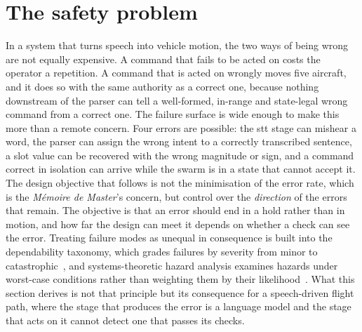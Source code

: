 \section{The safety problem}
\label{sec:safety-problem}
In a system that turns speech into vehicle motion, the two ways of being wrong are not equally
expensive. A command that fails to be acted on costs the operator a repetition. A command that is
acted on wrongly moves five aircraft, and it does so with the same authority as a correct one,
because nothing downstream of the parser can tell a well-formed, in-range and state-legal wrong
command from a correct one. The failure surface is wide enough to make this more than a remote
concern. Four errors are possible: the \gls{stt} stage can mishear a word, the parser can assign
the wrong intent to a correctly transcribed sentence, a slot value can be recovered with the wrong
magnitude or sign, and a command correct in isolation can arrive while the swarm is in a state
that cannot accept it. The design objective that follows is not the minimisation of the error
rate, which is the \emph{M\'emoire de Master}'s concern, but control over the \emph{direction} of
the errors that remain. The objective is that an error should end in a hold rather than in motion,
and how far the design can meet it depends on whether a check can see the error. Treating failure
modes as unequal in consequence is built into the dependability taxonomy, which grades failures by
severity from minor to catastrophic~\cite{avizienis2004}, and systems-theoretic hazard analysis
examines hazards under worst-case conditions rather than weighting them by their likelihood~\cite{stpa}.
What this section derives is not that principle but its consequence for a speech-driven flight
path, where the stage that produces the error is a language model and the stage that acts on it
cannot detect one that passes its checks.

